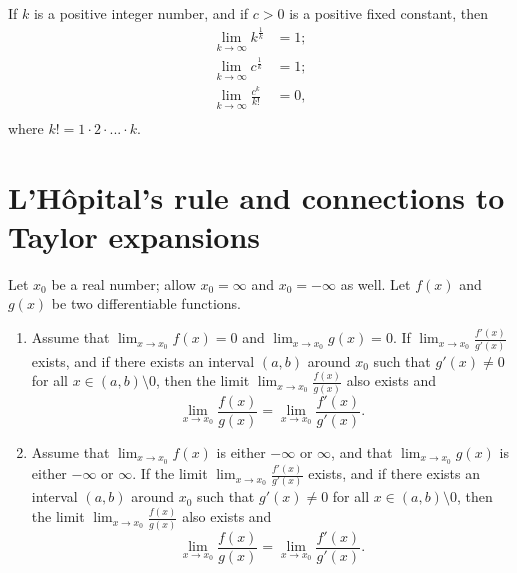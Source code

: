 \begin{lemma}
    If $ k $ is a positive integer number, and if $ c > 0 $ is a positive fixed
        constant, then
    \begin{align}
        \lim_{k \rightarrow \infty} k^{\frac{1}{k}} &= 1; \\
        \lim_{k \rightarrow \infty} c^{\frac{1}{k}} &= 1; \\
        \lim_{k \rightarrow \infty} \frac{c^k}{k!} &= 0, \\
    \end{align}
    where $ k! = 1 \cdot 2 \cdot ... \cdot k $.
\end{lemma}

\section{L'H\^{o}pital's rule and connections to Taylor expansions}
\begin{theorem}
    Let $ x_0 $ be a real number; allow $ x_0 = \infty $ and $ x_0 = -\infty $
        as well.
    Let $ f(x) $ and $ g(x) $ be two differentiable functions.
    \begin{enumerate}[label=(\roman*)]
        \item Assume that $ \lim_{x \rightarrow x_0} f(x) = 0 $ and
                $ \lim_{x \rightarrow x_0} g(x) = 0 $.
            If $ \lim_{x \rightarrow x_0} \frac{f'(x)}{g'(x)} $ exists, and if
                there exists an interval $ (a, b) $ around $ x_0 $ such that
                $ g'(x) \neq 0 $ for all $ x \in (a, b) \setminus 0 $, then the
                limit $ \lim_{x \rightarrow x_0} \frac{f(x)}{g(x)} $ also exists
                and
            \begin{equation*}
                \lim_{x \rightarrow x_0} \frac{f(x)}{g(x)} =
                    \lim_{x \rightarrow x_0} \frac{f'(x)}{g'(x)}.
            \end{equation*}
        \item Assume that $ \lim_{x \rightarrow x_0} f(x) $ is either
                $ -\infty $ or $ \infty $, and that $ \lim_{x \rightarrow x_0}
                g(x) $ is either $ -\infty $ or $ \infty $.
            If the limit $ \lim_{x \rightarrow x_0} \frac{f'(x)}{g'(x)} $
                exists, and if there exists an interval $ (a, b) $ around
                $ x_0 $ such that $ g'(x) \neq 0 $ for all $ x \in (a, b)
                \setminus 0 $, then the limit $ \lim_{x \rightarrow x_0}
                \frac{f(x)}{g(x)} $ also exists and
            \begin{equation*}
                \lim_{x \rightarrow x_0} \frac{f(x)}{g(x)} =
                    \lim_{x \rightarrow x_0} \frac{f'(x)}{g'(x)}.
            \end{equation*}
    \end{enumerate}
\end{theorem}

